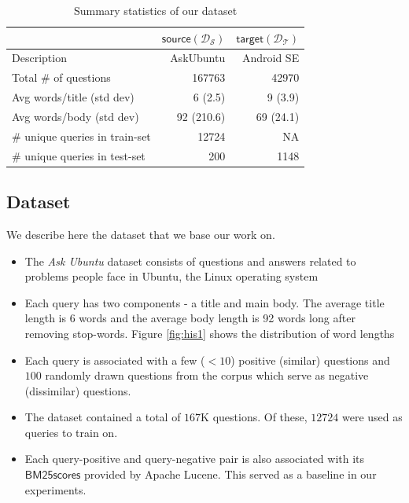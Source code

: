 \documentclass{sigkddExp}
\begin{document}
\begin{table}[h]
\begin{tabular}{l|r|r}
     
     & $\mathsf{source} (\mathcal{D_S})$
     & $\mathsf{target} (\mathcal{D_T})$
     \\
     \toprule
     Description
     & \textsf{AskUbuntu}
     & \textsf{Android SE}
     \\
     Total \# of questions
     & 167763
     & 42970
     \\
     Avg words/title (std dev)
     & 6 (2.5)
     & 9 (3.9)
     \\
     Avg words/body (std dev)
     & 92 (210.6)
     & 69 (24.1)
     \\
     \# unique queries in train-set
     & 12724
     & NA
     \\
     \# unique queries in test-set
     & 200
     & 1148
     
\end{tabular}
\caption{Summary statistics of our dataset}
\label{tab:dataset}
\end{table}

\subsection{Dataset}
We describe here the dataset that we base our work on.
\begin{itemize}[topsep=0pt,itemsep=-1ex,partopsep=1ex,parsep=1ex]
\item The \textit{Ask Ubuntu} dataset consists of questions and answers related to problems people face in Ubuntu, the Linux operating system
\item Each query has two components - a title and main body. The average title length is 6 words and the average body length is 92 words long after removing stop-words. Figure \ref{fig:his1} shows the distribution of word lengths
\item Each query is associated with a few ($<10$) positive (similar) questions and $100$ randomly drawn questions from the corpus which serve as negative (dissimilar) questions.
\item The dataset contained a total of $167$K questions. Of these, $12724$ were used as queries to train on.
\item Each query-positive and query-negative pair is also associated with its $\mathsf{BM25 scores}$ provided by Apache Lucene. This served as a baseline in our experiments.
\end{itemize}
\end{document}
